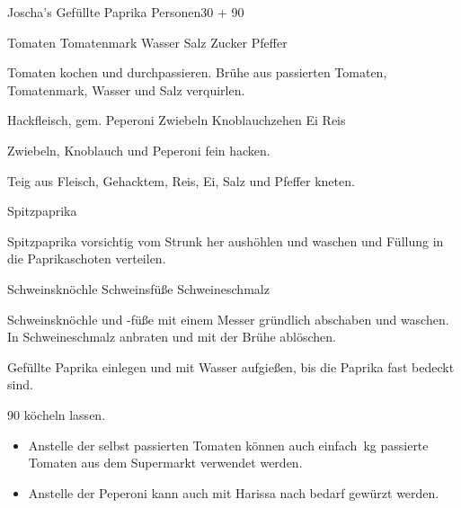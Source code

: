 \begin{MyRecipe}{Joscha's Gefüllte Paprika}{ Personen}{\SI{30}{\minuteprime} + \SI{90}{\minuteprime} }
	

	\ingredient[\Calc{1}{\x}]{\si{\kilogram}} {Tomaten}
	\ingredient[\Calc{100}{\x}]{\si{\gram}} {Tomatenmark}
	\ingredient[\Calc{2}{\x}]{\si{\liter}} {Wasser}
	\ingredient[]{} {Salz}
	\ingredient[]{} {Zucker}
 	\ingredient[]{} {Pfeffer}

	Tomaten kochen und durchpassieren. Brühe aus passierten Tomaten, Tomatenmark, Wasser  und Salz verquirlen. 

	\ingredient[\Calc{0.5}{\x}]{\si{\kilogram}} {Hackfleisch, gem.}
	\ingredient[\Calc{2}{\x}]{} {Peperoni}
	\ingredient[\Calc{2}{\x}]{} {Zwiebeln}
	\ingredient[\Calc{2}{\x}]{} {Knoblauchzehen}
	\ingredient[\Calc{1}{\x}]{} {Ei}
	\ingredient[\Calc{160}{\x}]{\si{\gram}} {Reis}

	Zwiebeln, Knoblauch und Peperoni fein hacken.

	Teig aus Fleisch, Gehacktem, Reis, Ei, Salz und Pfeffer kneten.\par\bigskip

	\ingredient[\Calc{12}{\x}]{} {Spitzpaprika}

	Spitzpaprika vorsichtig vom Strunk her aushöhlen und waschen und Füllung in die Paprikaschoten verteilen.

	\ingredient[\Calc{3}{\x}]{} {Schweinsknöchle}
	\ingredient[\Calc{2}{\x}]{} {Schweinsfüße}
	\ingredient[\Calc{1}{\x}]{\si{\Essloeffel}} {Schweineschmalz}

	Schweinsknöchle und -füße mit einem Messer gründlich abschaben und waschen. In Schweineschmalz anbraten und mit der Brühe ablöschen.
	
	Gefüllte Paprika einlegen und mit Wasser aufgießen, bis die Paprika fast bedeckt sind.
	
	\SI{90}{\minuteprime} köcheln lassen.	\par\bigskip


	\begin{itemize}
		\item Anstelle der selbst passierten Tomaten können auch einfach \,\si{\kilogram} passierte Tomaten aus dem Supermarkt verwendet werden. 
	
		\item Anstelle der Peperoni kann auch mit Harissa nach bedarf gewürzt werden.
	\end{itemize}
	\par\bigskip



	
	
	
\end{MyRecipe}